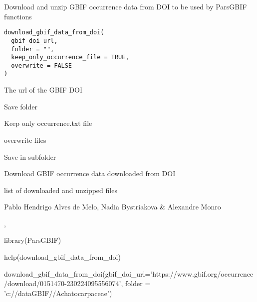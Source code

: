 \documentclass[a4paper]{book}
\begin{document}
%
\begin{Description}
Download and unzip GBIF occurrence data from DOI to be used by ParsGBIF functions
\end{Description}
%
\begin{Usage}
\begin{verbatim}
download_gbif_data_from_doi(
  gbif_doi_url,
  folder = "",
  keep_only_occurrence_file = TRUE,
  overwrite = FALSE
)
\end{verbatim}
\end{Usage}
%
\begin{Arguments}
\begin{ldescription}
\item[\code{gbif\_doi\_url}] The url of the GBIF DOI

\item[\code{folder}] Save folder

\item[\code{keep\_only\_occurrence\_file}] Keep only occurrence.txt file

\item[\code{overwrite}] overwrite files

\item[\code{subfolder}] Save in subfolder
\end{ldescription}
\end{Arguments}
%
\begin{Details}
Download GBIF occurrence data downloaded from DOI
\end{Details}
%
\begin{Value}
list of downloaded and unzipped files
\end{Value}
%
\begin{Author}
Pablo Hendrigo Alves de Melo,
Nadia Bystriakova \&
Alexandre Monro
\end{Author}
%
\begin{SeeAlso}
, 
\end{SeeAlso}
%
\begin{Examples}
\begin{ExampleCode}


library(ParsGBIF)

help(download_gbif_data_from_doi)

download_gbif_data_from_doi(gbif_doi_url='https://www.gbif.org/occurrence/download/0151470-230224095556074',
                            folder = 'c://dataGBIF//Achatocarpaceae')


\end{ExampleCode}
\end{Examples}
\end{document}
